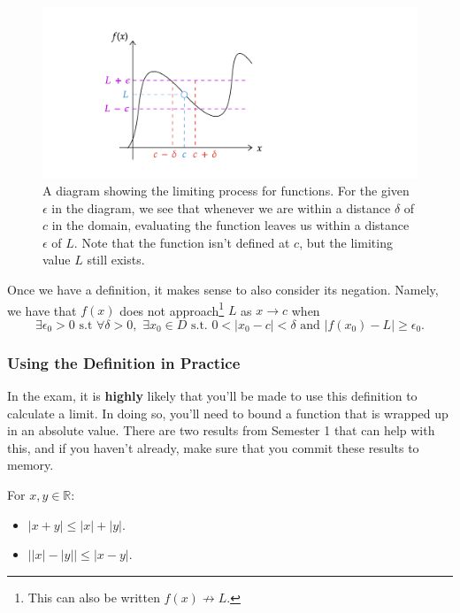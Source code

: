 \documentclass[
  12pt,
  a4paper]{extarticle}
\providecommand{\tightlist}{%
  \setlength{\itemsep}{0pt}\setlength{\parskip}{0pt}}
\theoremstyle{plain}
\theoremstyle{definition}
\theoremstyle{plain}
\theoremstyle{plain}
\theoremstyle{plain}
\theoremstyle{plain}
\theoremstyle{definition}
\theoremstyle{definition}
\theoremstyle{remark}
\theoremstyle{remark}
\let\BeginKnitrBlock\begin \let\EndKnitrBlock\end
\renewcommand{\;}{\,}
\begin{document}
\begin{figure}
\includegraphics[width=\Width,height=\Height]{Functionlimit} \caption{A diagram showing the limiting process for functions. For the given $\epsilon$ in the diagram, we see that whenever we are within a distance $\delta$ of $c$ in the domain, evaluating the function leaves us within a distance $\epsilon$ of $L$. Note that the function isn't defined at $c$, but the limiting value $L$ still exists.}\label{fig:funclim}
\end{figure}

Once we have a definition, it makes sense to also consider its negation. Namely, we have that \(f(x)\) does not approach\footnote{This can also be written \(f(x) \not\to L\).} \(L\) as \(x \to c\) when \[\exists \epsilon_0 > 0\;\;\text{s.t}\;\;\forall \delta > 0,\;\; \exists x_0 \in D \;\; \text{s.t.}\;\; 0 < \lvert x_0 - c \rvert < \delta\;\; \text{and}\;\; \lvert f(x_0) - L \rvert \geq \epsilon_0.\]

\hypertarget{using-the-definition-in-practice}{%
\subsubsection{Using the Definition in Practice}\label{using-the-definition-in-practice}}

In the exam, it is \textbf{highly} likely that you'll be made to use this definition to calculate a limit. In doing so, you'll need to bound a function that is wrapped up in an absolute value. There are two results from Semester 1 that can help with this, and if you haven't already, make sure that you commit these results to memory.
\BeginKnitrBlock{theorem}[Triangle Inequalities]
{\label{thm:thm46} }For \(x,y \in \mathbb{R}\):

\begin{itemize}
\tightlist
\item
  \(\lvert x + y \rvert \leq \lvert x \rvert + \lvert y \rvert.\)
\item
  \(\left\lvert \lvert x \rvert - \lvert y \rvert \right\rvert \leq \lvert x - y \rvert.\)
\end{itemize}
\EndKnitrBlock{theorem}
\end{document}
